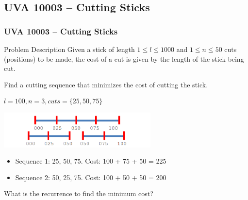 \documentclass{beamer}
\begin{document}
\subsection{UVA 10003 -- Cutting Sticks}
\begin{frame}
  \frametitle{UVA 10003 -- Cutting Sticks}
  
  {\smaller
  \begin{block}{Problem Description}
    Given a stick of length $1 \leq l \leq 1000$ and $1 \leq n \leq
    50$ cuts (positions) to be made, the cost of a cut is given by the length of 
    the stick being cut.

    \medskip

    Find a cutting sequence that minimizes the cost of cutting the stick.
  \end{block}
  
  \medskip

   $l=100, n=3, cuts=\{25,50,75\}$

  \begin{center}
    \includegraphics[width=0.6\textwidth]{../img/cuttingsticks}
  \end{center}

  \begin{itemize}
  \item Sequence 1: 25, 50, 75. Cost: 100 + 75 + 50 = 225
  \item Sequence 2: 50, 25, 75. Cost: 100 + 50 + 50 = 200
  \end{itemize}

  \begin{block}{}
  What is the recurrence to find the minimum cost?
  \end{block}
  }
\end{frame}
\end{document}
